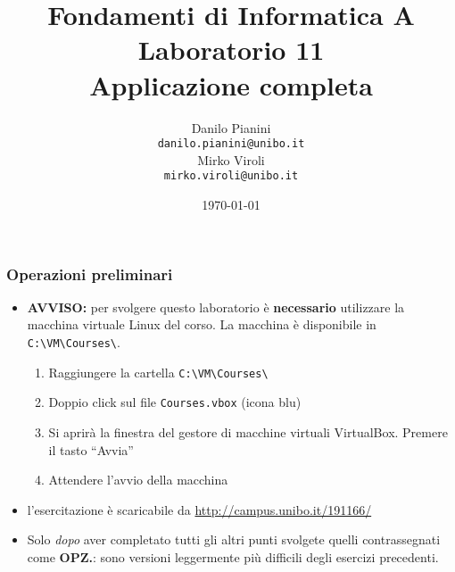 \documentclass{beamer}
\newcommand{\vmfolder}{\texttt{C:\textbackslash{}VM\textbackslash{}Courses\textbackslash{}}}
\begin{document}
\title[Lab1 - FV]{Fondamenti di Informatica A \\ Laboratorio 11 \\ Applicazione completa}
\author[Danilo Pianini]{Danilo Pianini\\\texttt{danilo.pianini@unibo.it} \\ \vspace{3pt} Mirko Viroli\\\texttt{mirko.viroli@unibo.it} }
\date[\today]{\today}

\frame{\titlepage} 

\begin{frame}[fragile]
\frametitle{Operazioni preliminari}
\begin{itemize}
 \item \textbf{AVVISO:} per svolgere questo laboratorio è \textbf{necessario} utilizzare la macchina virtuale Linux del corso. La macchina è disponibile in \vmfolder{}.
  \begin{enumerate}
  \item Raggiungere la cartella \vmfolder{}
  \item Doppio click sul file \texttt{Courses.vbox} (icona blu)
  \item Si aprirà la finestra del gestore di macchine virtuali VirtualBox. Premere il tasto ``Avvia''
  \item Attendere l'avvio della macchina
 \end{enumerate}
 \item l'esercitazione è scaricabile da \url{http://campus.unibo.it/191166/}
 \item Solo \textit{dopo} aver completato tutti gli altri punti svolgete quelli contrassegnati come \textbf{OPZ.}: sono versioni leggermente più difficili degli esercizi precedenti.
\end{itemize}
\end{frame}
\end{document}
